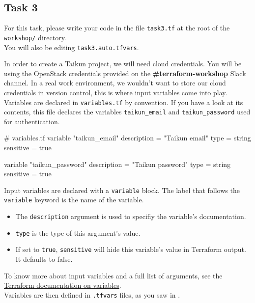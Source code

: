 \subsection{Task 3}\label{sec:task3}

\begin{note}
For this task, please write your code in the file \texttt{task3.tf}
at the root of the \texttt{workshop/} directory.\\
You will also be editing \texttt{task3.auto.tfvars}.
\end{note}

In order to create a Taikun project, we will need cloud credentials.
You will be using the OpenStack credentials provided on the \textbf{\#terraform-workshop}
Slack channel. In a real work environment, we wouldn't want to store our cloud credentials in version control,
this is where input variables come into play.\\

Variables are declared in \texttt{variables.tf} by convention.
If you have a look at its contents,
this file declares the variables \texttt{taikun\_email} and
\texttt{taikun\_password} used for authentication.
\begin{tf}
# variables.tf
variable "taikun_email" {
  description = "Taikun email"
  type        = string
  sensitive   = true
}

variable "taikun_password" {
  description = "Taikun password"
  type        = string
  sensitive   = true
}
\end{tf}

\begin{tip}
  Input variables are declared with a \texttt{variable} block.
  The label that follows the \texttt{variable} keyword is the name of the variable.

  \begin{itemize}
    \item The \texttt{description} argument is used to specifiy the variable's documentation.
    \item \texttt{type} is the type of this argument's value.
    \item If set to \texttt{true}, \texttt{sensitive} will hide this variable's value in Terraform output. It defaults to false.
  \end{itemize}

  To know more about input variables and a full list of arguments,
  see the \href{https://www.terraform.io/docs/language/values/variables.html}{Terraform documentation on variables}.\\

  Variables are then defined in \texttt{.tfvars} files, as you saw in .\\
\end{tip}

